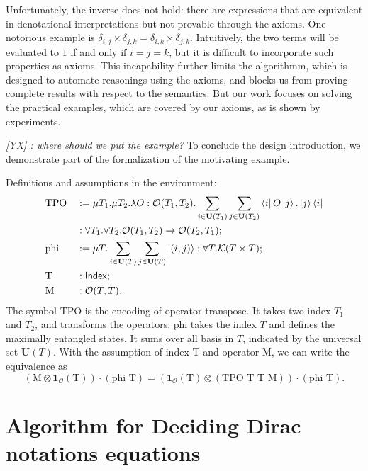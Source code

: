 \documentclass[runningheads]{llncs}
\newcommand{\yx}[1]{\textit{\color{blue}[YX] : #1}}
\begin{document}
Unfortunately, the inverse does not hold: there are expressions that are equivalent in denotational interpretations but not provable through the axioms.
One notorious example is $\delta_{i, j} \times \delta_{j, k} = \delta_{i, k} \times \delta_{j, k}$. Intuitively, the two terms will be evaluated to $1$ if and only if $i = j = k$, but it is difficult to incorporate such properties as axioms.
This incapability further limits the algorithmm, which is designed to automate reasonings using the axioms, and blocks us from proving complete results with respect to the semantics. But our work focuses on solving the practical examples, which are covered by our axioms, as is shown by experiments.


\yx{where should we put the example?}
To conclude the design introduction, we demonstrate part of the formalization of the motivating example.
\begin{example}
    Definitions and assumptions in the environment:
    \begin{align*}
        & \textrm{TPO} && := \mu T_1. \mu T_2. \lambda O : \mathcal{O}(T_1, T_2). \sum_{i \in \mathbf{U}(T_1)} \sum_{j \in \mathbf{U}(T_2)} \bra{i} O \ket{j} . \ket{j}\bra{i} \\
        & && : \forall T_1. \forall T_2. \mathcal{O}(T_1, T_2) \to \mathcal{O}(T_2, T_1); \\
        & \textrm{phi} && := \mu T. \sum_{i \in \mathbf{U}(T)} \sum_{j \in \mathbf{U}(T)} \ket{(i, j)} : \forall T.\mathcal{K}(T \times T); \\
        & \textrm{T} && : \mathsf{Index}; \\
        & \textrm{M} && : \mathcal{O}(T, T).
    \end{align*}
    The symbol TPO is the encoding of operator transpose. It takes two index $T_1$ and $T_2$, and transforms the operators.
    phi takes the index $T$ and defines the maximally entangled states. It sums over all basis in $T$, indicated by the universal set $\mathbf{U}(T)$.
    With the assumption of index T and operator M, we can write the equivalence as 
    \[
        (\textrm{M} \otimes \mathbf{1}_\mathcal{O}(\textrm{T})) \cdot (\textrm{phi T}) = (\mathbf{1}_\mathcal{O}(\textrm{T}) \otimes (\textrm{TPO T T M})) \cdot (\textrm{phi T}).
    \]
\end{example}





\section{Algorithm for Deciding Dirac notations equations}
\label{sec: decide}
\end{document}
